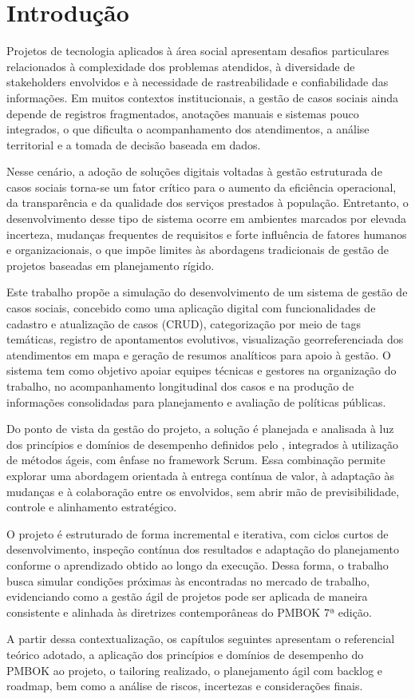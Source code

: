 \chapter{Introdução}\label{chp:Introducao}

Projetos de tecnologia aplicados à área social apresentam desafios particulares relacionados à complexidade dos problemas atendidos, à diversidade de stakeholders envolvidos e à necessidade de rastreabilidade e confiabilidade das informações. Em muitos contextos institucionais, a gestão de casos sociais ainda depende de registros fragmentados, anotações manuais e sistemas pouco integrados, o que dificulta o acompanhamento dos atendimentos, a análise territorial e a tomada de decisão baseada em dados.

Nesse cenário, a adoção de soluções digitais voltadas à gestão estruturada de casos sociais torna-se um fator crítico para o aumento da eficiência operacional, da transparência e da qualidade dos serviços prestados à população. Entretanto, o desenvolvimento desse tipo de sistema ocorre em ambientes marcados por elevada incerteza, mudanças frequentes de requisitos e forte influência de fatores humanos e organizacionais, o que impõe limites às abordagens tradicionais de gestão de projetos baseadas em planejamento rígido.

Este trabalho propõe a simulação do desenvolvimento de um sistema de gestão de casos sociais, concebido como uma aplicação digital com funcionalidades de cadastro e atualização de casos (CRUD), categorização por meio de tags temáticas, registro de apontamentos evolutivos, visualização georreferenciada dos atendimentos em mapa e geração de resumos analíticos para apoio à gestão. O sistema tem como objetivo apoiar equipes técnicas e gestores na organização do trabalho, no acompanhamento longitudinal dos casos e na produção de informações consolidadas para planejamento e avaliação de políticas públicas.

Do ponto de vista da gestão do projeto, a solução é planejada e analisada à luz dos princípios e domínios de desempenho definidos pelo \textcite{PMBOK7}, integrados à utilização de métodos ágeis, com ênfase no framework Scrum. Essa combinação permite explorar uma abordagem orientada à entrega contínua de valor, à adaptação às mudanças e à colaboração entre os envolvidos, sem abrir mão de previsibilidade, controle e alinhamento estratégico.

O projeto é estruturado de forma incremental e iterativa, com ciclos curtos de desenvolvimento, inspeção contínua dos resultados e adaptação do planejamento conforme o aprendizado obtido ao longo da execução. Dessa forma, o trabalho busca simular condições próximas às encontradas no mercado de trabalho, evidenciando como a gestão ágil de projetos pode ser aplicada de maneira consistente e alinhada às diretrizes contemporâneas do PMBOK 7ª edição.

A partir dessa contextualização, os capítulos seguintes apresentam o referencial teórico adotado, a aplicação dos princípios e domínios de desempenho do PMBOK ao projeto, o tailoring realizado, o planejamento ágil com backlog e roadmap, bem como a análise de riscos, incertezas e considerações finais.
